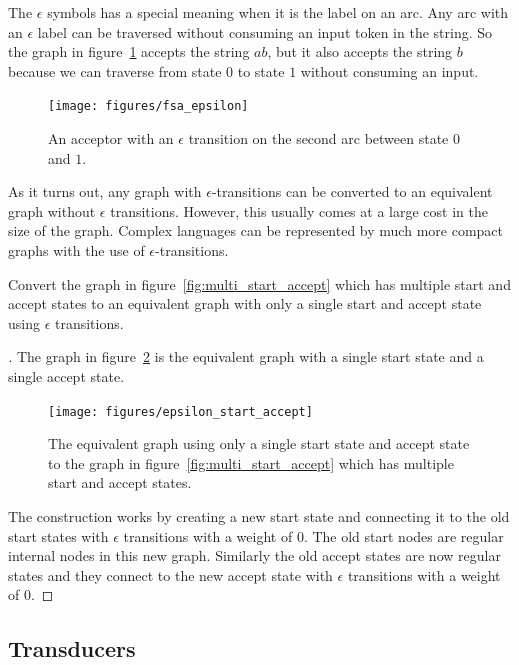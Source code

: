 The $\epsilon$ symbols has a special meaning when it is the label on an arc.
Any arc with an $\epsilon$ label can be traversed without consuming an input
token in the string. So the graph in figure~\ref{fig:fsa_epsilon} accepts the
string $ab$, but it also accepts the string $b$ because we can traverse from
state $0$ to state $1$ without consuming an input.

\begin{figure}
    \centering
    \texttt{[image: figures/fsa\_epsilon]}
    \caption{An acceptor with an $\epsilon$ transition on the second arc
    between state $0$ and $1$.}
    \label{fig:fsa_epsilon}
\end{figure}

As it turns out, any graph with $\epsilon$-transitions can be converted to an
equivalent graph without $\epsilon$ transitions. However, this usually comes at
a large cost in the size of the graph. Complex languages can be represented by
much more compact graphs with the use of $\epsilon$-transitions.

\begin{example}
Convert the graph in figure~\ref{fig:multi_start_accept} which has multiple
start and accept states to an equivalent graph with only a single start and
accept state using $\epsilon$ transitions.
\end{example}

\begin{proof}[\unskip\nopunct]
The graph in figure~\ref{fig:epsilon_start_accept} is the equivalent graph
with a single start state and a single accept state.

\begin{figure}
    \centering
    \texttt{[image: figures/epsilon\_start\_accept]}
    \caption{The equivalent graph using only a single start state and accept
    state to the graph in figure~\ref{fig:multi_start_accept} which has
    multiple start and accept states.}
    \label{fig:epsilon_start_accept}
\end{figure}

The construction works by creating a new start state and connecting it to the
old start states with $\epsilon$ transitions with a weight of $0$. The old
start nodes are regular internal nodes in this new graph. Similarly the old
accept states are now regular states and they connect to the new accept state
with $\epsilon$ transitions with a weight of $0$.
\end{proof}

\subsection{Transducers}

